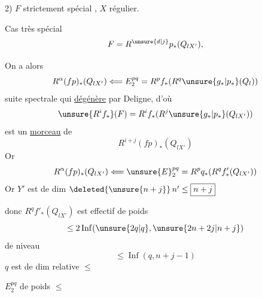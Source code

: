 2) \(F\)  strictement spécial
, \(X\) régulier.

Cas très spécial
\[
F=R^{\unsure{d|j}}p_*(Q_{lX'}),
\]

On a alors
\[
R^\alpha(fp)_*(Q_{lX'})
\Longleftarrow E_2^{pq}=R^pf_*(R^q\unsure{g_*|p_*}(Q_l))
\]
suite spectrale qui \uline{dégénère} par Deligne,
d'où
\[
\unsure{R^if_*}(F)=R^if_*(R^j\unsure{g_*|p_*}(Q_{lX'}))
\]
est un \uline{morceau} de
\[
R^{i+j}(fp)_*(Q_{lX'})
\]
Or
\[
R^\alpha(fp)_*(Q_{lX'})
\Longleftarrow \unsure{E}_2^{pq}=R^pq_*(R^qf'_*(Q_{lX'}))
\]
Or \(Y'\) est de dim \(\deleted{\unsure{n+j}}\,n'\le\boxed{n+j}\)

donc \(R^qf'_*(Q_{lX'})\) est effectif de poids
\[
\le2\operatorname{Inf}(\unsure{2q|q},\unsure{2n+2j|n+j})
\]
de niveau
\[
\le\operatorname{Inf}(q,n+j-1)
\]
\(q\) est de dim relative \(\le\)


 \(E_2^{pq}\) de poids \(\le\)
